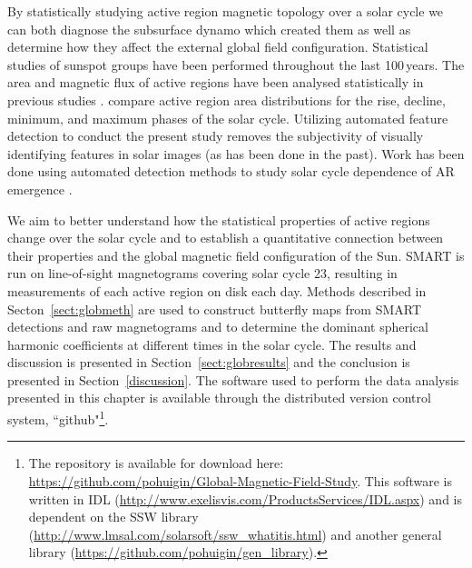 By statistically studying active region magnetic topology over a solar cycle we can both diagnose the subsurface dynamo which created them as well as determine how they affect the external global field configuration. 
Statistical studies of sunspot groups have been performed throughout the last 100\,years. The area and magnetic flux of active regions have been analysed statistically in previous studies \citep{tang:1984}. \citet{harvey:1993} compare active region area distributions for the rise, decline, minimum, and maximum phases of the solar cycle.
Utilizing automated feature detection to conduct the present study removes the subjectivity of visually identifying features in solar images (as has been done in the past).
Work has been done using automated detection methods to study solar cycle dependence of \gls{AR} emergence \citep{higgins:2011,zhang:2010}.

We aim to better understand how the statistical properties of active regions change over the solar cycle and to establish a quantitative connection between their properties and the global magnetic field configuration of the Sun. \gls{SMART} is run on line-of-sight magnetograms covering solar cycle 23, resulting in measurements of each active region on disk each day. 
Methods described in Secton~\ref{sect:globmeth} are used to construct butterfly maps from \gls{SMART} detections and raw magnetograms and to determine the dominant spherical harmonic coefficients at different times in the solar cycle. The results and discussion is presented in Section~\ref{sect:globresults} and the conclusion is presented in Section~\ref{discussion}. The software used to perform the data analysis presented in this chapter is available through the distributed version control system, ``github"\footnote{The repository is available for download here: \url{https://github.com/pohuigin/Global-Magnetic-Field-Study}. This software is written in IDL (\url{http://www.exelisvis.com/ProductsServices/IDL.aspx}) and is dependent on the SSW library (\url{http://www.lmsal.com/solarsoft/ssw\_whatitis.html}) and another general library (\url{https://github.com/pohuigin/gen\_library}).}.

